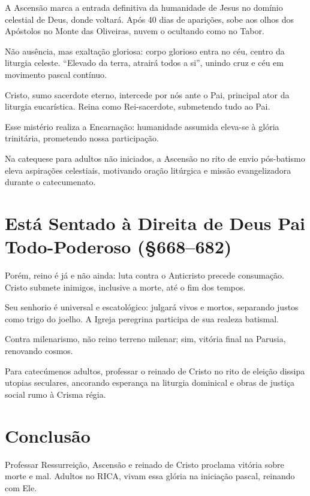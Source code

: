 A Ascensão marca a entrada definitiva da humanidade de Jesus no domínio celestial de Deus, donde voltará. Após 40 dias de aparições, sobe aos olhos dos Apóstolos no Monte das Oliveiras, nuvem o ocultando como no Tabor.

Não ausência, mas exaltação gloriosa: corpo glorioso entra no céu, centro da liturgia celeste. ``Elevado da terra, atrairá todos a si'', unindo cruz e céu em movimento pascal contínuo.

Cristo, sumo sacerdote eterno, intercede por nós ante o Pai, principal ator da liturgia eucarística. Reina como Rei-sacerdote, submetendo tudo ao Pai.

Esse mistério realiza a Encarnação: humanidade assumida eleva-se à glória trinitária, prometendo nossa participação.

Na catequese para adultos não iniciados, a Ascensão no rito de envio pós-batismo eleva aspirações celestiais, motivando oração litúrgica e missão evangelizadora durante o catecumenato.

\section{Está Sentado à Direita de Deus Pai Todo-Poderoso (\S 668--682)}

Porém, reino é já e não ainda: luta contra o Anticristo precede consumação. Cristo submete inimigos, inclusive a morte, até o fim dos tempos.

Seu senhorio é universal e escatológico: julgará vivos e mortos, separando justos como trigo do joelho. A Igreja peregrina participa de sua realeza batismal.

Contra milenarismo, não reino terreno milenar; sim, vitória final na Parusia, renovando cosmos.

Para catecúmenos adultos, professar o reinado de Cristo no rito de eleição dissipa utopias seculares, ancorando esperança na liturgia dominical e obras de justiça social rumo à Crisma régia.

\section{Conclusão}

Professar Ressurreição, Ascensão e reinado de Cristo proclama vitória sobre morte e mal. Adultos no RICA, vivam essa glória na iniciação pascal, reinando com Ele.